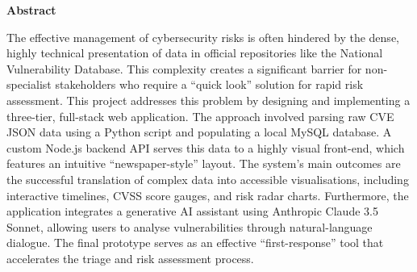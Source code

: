 \documentclass[12pt,a4paper]{article}
\begin{document}
\begin{titlepage}
        \par
        \begin{minipage}{0.9\textwidth}
            \normalsize
            \centering
            {\bfseries Abstract}
            \par\medskip
            \noindent
            The effective management of cybersecurity risks is often hindered by the dense, highly technical presentation of data in official repositories like the National Vulnerability Database.
            This complexity creates a significant barrier for non-specialist stakeholders who require a ``quick look'' solution for rapid risk assessment.
            This project addresses this problem by designing and implementing a three-tier, full-stack web application.
            The approach involved parsing raw CVE JSON data using a Python script and populating a local MySQL database.
            A custom Node.js backend API serves this data to a highly visual front-end, which features an intuitive ``newspaper-style'' layout.
            The system's main outcomes are the successful translation of complex data into accessible visualisations, including interactive timelines, CVSS score gauges, and risk radar charts.
            Furthermore, the application integrates a generative AI assistant using Anthropic Claude 3.5 Sonnet, allowing users to analyse vulnerabilities through natural-language dialogue.
            The final prototype serves as an effective ``first-response'' tool that accelerates the triage and risk assessment process.
        \end{minipage}
        \vfill %
    \end{titlepage}
\end{document}
